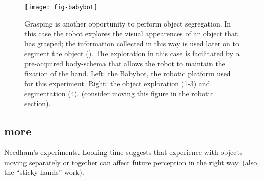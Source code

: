 \begin{figure}[t]

\centerline{
\texttt{[image: fig-babybot]}
}

\caption{
%
Grasping is another opportunity to perform object segregation. In this case the robot explores the visual appearences of an object that has grasped; the information collected in this way is used later on to segment the object (\cite{natale05exploring}). The exploration in this case is facilitated by a pre-acquired body-schema that allows the robot to maintain the fixation of the hand. Left: the Babybot, the robotic platform used for this experiment. Right: the object exploration (1-3) and segmentation (4). (consider moving this figure in the robotic section). 
%
}

\label{fig:babybot}

\end{figure}

\subsection{more}

Needham's experiments. 
\cite{needham01object,needham97object}
Looking time suggests that experience with objects moving separately
or together can affect future perception in the right way.
(also, the ``sticky hands'' work).

